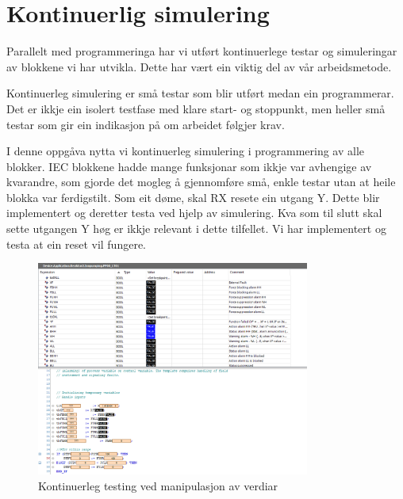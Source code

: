 \section{Kontinuerlig simulering}
\thispagestyle{fancy}

Parallelt med programmeringa har vi utført kontinuerlege testar og simuleringar av blokkene vi har utvikla. 
Dette har vært ein viktig del av vår arbeidsmetode. 

Kontinuerleg simulering er små testar som blir utført medan ein programmerar.
Det er ikkje ein isolert testfase med klare start- og stoppunkt, men heller små testar som gir ein indikasjon
på om arbeidet følgjer krav.

I denne oppgåva nytta vi kontinuerleg simulering i programmering av alle blokker.
\gls{IEC} blokkene hadde mange funksjonar som ikkje var avhengige av kvarandre,
som gjorde det mogleg å gjennomføre små, enkle testar utan at heile blokka var ferdigstilt.\newline
Som eit døme, skal \gls{RX} resete ein utgang \gls{Y}. Dette blir implementert og deretter testa ved hjelp av simulering.
Kva som til slutt skal sette utgangen \gls{Y} høg er ikkje relevant i dette tilfellet. Vi har implementert 
og testa at ein reset vil fungere.


\begin{figure}[htbp]
    \centering
    \includegraphics[width=0.8\textwidth]{Bilder/kontinuerligSimulering.png}
    \caption{Kontinuerleg testing ved manipulasjon av verdiar}\label{fig:KontinuerlegSimulering}
\end{figure}


\newpage
